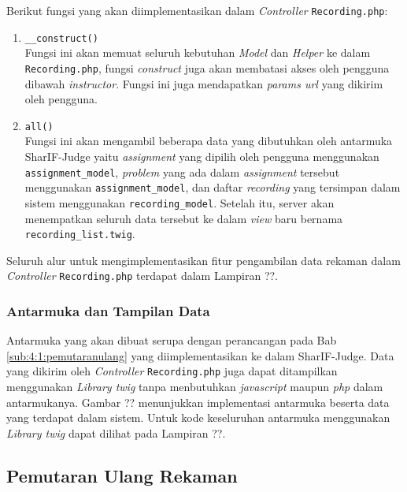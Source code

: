 Berikut fungsi yang akan diimplementasikan dalam \textit{Controller} \verb|Recording.php|:
\begin{enumerate}
    \item \verb|__construct()| \\
    Fungsi ini akan memuat seluruh kebutuhan \textit{Model} dan \textit{Helper} ke dalam \verb|Recording.php|, fungsi \textit{construct} juga akan membatasi akses oleh pengguna dibawah \textit{instructor}. Fungsi ini juga mendapatkan \textit{params url} yang dikirim oleh pengguna. 

    \item \verb|all()| \\
    Fungsi ini akan mengambil beberapa data yang dibutuhkan oleh antarmuka SharIF-Judge yaitu \textit{assignment} yang dipilih oleh pengguna menggunakan \verb|assignment_model|, \textit{problem} yang ada dalam \textit{assignment} tersebut menggunakan \verb|assignment_model|, dan daftar \textit{recording} yang tersimpan dalam sistem menggunakan \verb|recording_model|. Setelah itu, server akan menempatkan seluruh data tersebut ke dalam \textit{view} baru bernama \verb|recording_list.twig|.
\end{enumerate}

Seluruh alur untuk mengimplementasikan fitur pengambilan data rekaman dalam \textit{Controller} \verb|Recording.php| terdapat dalam Lampiran ??.

\subsubsection{Antarmuka dan Tampilan Data}

Antarmuka yang akan dibuat serupa dengan perancangan pada Bab \ref{sub:4:1:pemutaranulang} yang diimplementasikan ke dalam SharIF-Judge. Data yang dikirim oleh \textit{Controller} \verb|Recording.php| juga dapat ditampilkan menggunakan \textit{Library twig} tanpa menbutuhkan \textit{javascript} maupun \textit{php} dalam antarmukanya. Gambar ?? menunjukkan implementasi antarmuka beserta data yang terdapat dalam sistem. Untuk kode keseluruhan antarmuka menggunakan \textit{Library twig} dapat dilihat pada Lampiran ??.

\subsection{Pemutaran Ulang Rekaman}

